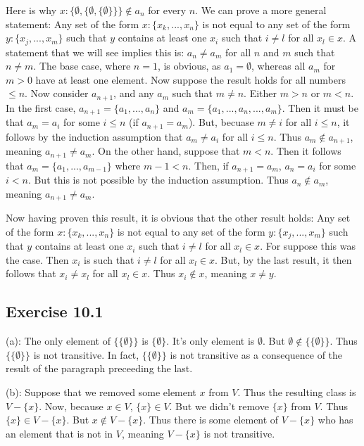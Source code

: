 \documentclass{article}
\theoremstyle{definition}
\begin{document}
Here is why $x:\{\emptyset,\{\emptyset,\{\emptyset\}\}\}\notin a_n$ for every $n$. We can prove a more general statement: Any set of the form $x:\{x_k,...,x_n\}$ is not equal to any 
set of the form $y:\{x_j,...,x_m\}$ such that $y$ contains at least one $x_i$ such that $i\ne l$ for all $x_l\in x$. A statement that we will see implies this is: $a_n\ne a_m$ for all 
$n$ and $m$ such that $n\ne m$. The base case, where $n=1$, is obvious, as $a_1=\emptyset$, whereas all $a_m$ for $m>0$ have at least one element. Now suppose the result holds for all numbers $\le n$. 
Now consider $a_{n+1}$, and any $a_m$ such that $m\ne n$. Either $m>n$ or $m<n$. In the first case, 
$a_{n+1}=\{a_1,...,a_n\}$ and $a_m=\{a_1,...,a_n,...,a_m\}$. Then it must be that $a_m=a_i$ for some $i\le n$ (if $a_{n+1}=a_m$). 
But, becuase $m\ne i$ for all $i\le n$, it follows by the induction assumption 
that $a_m\ne a_i$ for all $i\le n$. Thus $a_m\notin a_{n+1}$, meaning $a_{n+1}\ne a_m$. On the other hand, suppose that $m<n$. Then it follows that 
$a_m=\{a_1,...,a_{m-1}\}$ where $m-1<n$. Then, if $a_{n+1}=a_m$, $a_n=a_i$ for some $i<n$. But this is not possible by the induction assumption. Thus $a_n\notin a_m$, meaning 
$a_{n+1}\ne a_m$. 


Now having proven this result, it is obvious that the other result holds: Any set of the form $x:\{x_k,...,x_n\}$ is not equal to any
set of the form $y:\{x_j,...,x_m\}$ such that $y$ contains at least one $x_i$ such that $i\ne l$ for all $x_l\in x$. For suppose this was the case. Then $x_i$ is such that $i\ne l$ for 
all $x_l\in x$. But, by the last result, it then follows that $x_i\ne x_l$ for all $x_l\in x$. Thus $x_i\notin x$, meaning $x\ne y$.

\subsection*{Exercise 10.1}
(a): The only element of $\{\{\emptyset\}\}$ is $\{\emptyset\}$. It's only element is $\emptyset$. But $\emptyset\notin\{\{\emptyset\}\}$. Thus 
$\{\{\emptyset\}\}$ is not transitive. In fact, $\{\{\emptyset\}\}$ is not transitive as a consequence of the result of the paragraph preceeding the last.


(b): Suppose that we removed some element $x$ from $V$. Thus the resulting class is $V-\{x\}$. Now, because $x\in V$, 
$\{x\}\in V$. But we didn't remove $\{x\}$ from $V$. Thus $\{x\}\in V-\{x\}$. But $x\notin V-\{x\}$. Thus there is some element of 
$V-\{x\}$ who has an element that is not in $V$, meaning $V-\{x\}$ is not transitive. 
\end{document}

